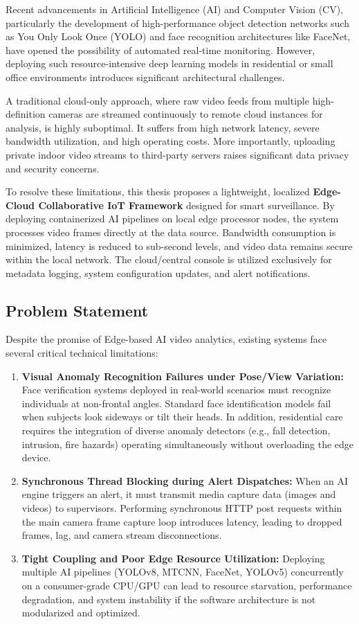 \documentclass[12pt,a4paper]{article}
\begin{document}
Recent advancements in Artificial Intelligence (AI) and Computer Vision (CV), particularly the development of high-performance object detection networks such as You Only Look Once (YOLO) and face recognition architectures like FaceNet, have opened the possibility of automated real-time monitoring. However, deploying such resource-intensive deep learning models in residential or small office environments introduces significant architectural challenges. 

A traditional cloud-only approach, where raw video feeds from multiple high-definition cameras are streamed continuously to remote cloud instances for analysis, is highly suboptimal. It suffers from high network latency, severe bandwidth utilization, and high operating costs. More importantly, uploading private indoor video streams to third-party servers raises significant data privacy and security concerns. 

To resolve these limitations, this thesis proposes a lightweight, localized \textbf{Edge-Cloud Collaborative IoT Framework} designed for smart surveillance. By deploying containerized AI pipelines on local edge processor nodes, the system processes video frames directly at the data source. Bandwidth consumption is minimized, latency is reduced to sub-second levels, and video data remains secure within the local network. The cloud/central console is utilized exclusively for metadata logging, system configuration updates, and alert notifications.

\subsection{Problem Statement}
Despite the promise of Edge-based AI video analytics, existing systems face several critical technical limitations:
\begin{enumerate}
    \item \textbf{Visual Anomaly Recognition Failures under Pose/View Variation:} Face verification systems deployed in real-world scenarios must recognize individuals at non-frontal angles. Standard face identification models fail when subjects look sideways or tilt their heads. In addition, residential care requires the integration of diverse anomaly detectors (e.g., fall detection, intrusion, fire hazards) operating simultaneously without overloading the edge device.
    \item \textbf{Synchronous Thread Blocking during Alert Dispatches:} When an AI engine triggers an alert, it must transmit media capture data (images and videos) to supervisors. Performing synchronous HTTP post requests within the main camera frame capture loop introduces latency, leading to dropped frames, lag, and camera stream disconnections.
    \item \textbf{Tight Coupling and Poor Edge Resource Utilization:} Deploying multiple AI pipelines (YOLOv8, MTCNN, FaceNet, YOLOv5) concurrently on a consumer-grade CPU/GPU can lead to resource starvation, performance degradation, and system instability if the software architecture is not modularized and optimized.
\end{enumerate}
\end{document}
